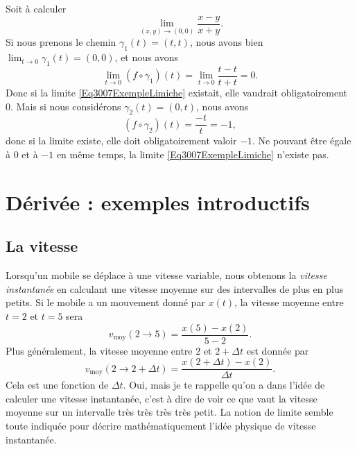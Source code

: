 \begin{example}
	Soit à calculer
	\begin{equation}	\label{Eq3007ExempleLimiche}
		\lim_{(x,y)\to(0,0)}\frac{ x-y }{ x+y }.
	\end{equation}
	Si nous prenons le chemin $\gamma_1(t)=(t,t)$, nous avons bien $\lim_{t\to 0} \gamma_1(t)=(0,0)$, et nous avons
	\begin{equation}
		\lim_{t\to 0} (f\circ\gamma_1)(t)=\lim_{t\to 0} \frac{ t-t }{ t+t }=0.
	\end{equation}
	Donc si la limite \eqref{Eq3007ExempleLimiche} existait, elle vaudrait obligatoirement $0$. Mais si nous considérons $\gamma_2(t)=(0,t)$, nous avons
	\begin{equation}
		(f\circ\gamma_2)(t)=\frac{ -t }{ t }=-1,
	\end{equation}
	donc si la limite existe, elle doit obligatoirement valoir $-1$. Ne pouvant être égale à $0$ et à $-1$ en même temps, la limite \eqref{Eq3007ExempleLimiche} n'existe pas.
\end{example}

\section{Dérivée : exemples introductifs}

\subsection{La vitesse}

Lorsqu'un mobile se déplace à une vitesse variable, nous obtenons la \emph{vitesse instantanée} en calculant une vitesse moyenne sur des intervalles de plus en plus petits. Si le mobile a un mouvement donné par $x(t)$, la vitesse moyenne entre $t=2$ et $t=5$ sera
\[ 
  v_{\text{moy}}(2\to 5)=\frac{ x(5)-x(2) }{ 5-2 }.
\]
Plus généralement, la vitesse moyenne entre $2$ et $2+\Delta t$ est donnée par
\[ 
  v_{\text{moy}}(2\to 2+\Delta t)=\frac{ x(2+\Delta t)-x(2) }{ \Delta t }.
\]
Cela est une fonction de $\Delta t$. Oui, mais je te rappelle qu'on a dans l'idée de calculer une vitesse instantanée, c'est à dire de voir ce que vaut la vitesse moyenne sur un intervalle très {\small très} {\footnotesize très} {\scriptsize très} {\tiny petit}. La notion de limite semble toute indiquée pour décrire mathématiquement l'idée physique de vitesse instantanée.

